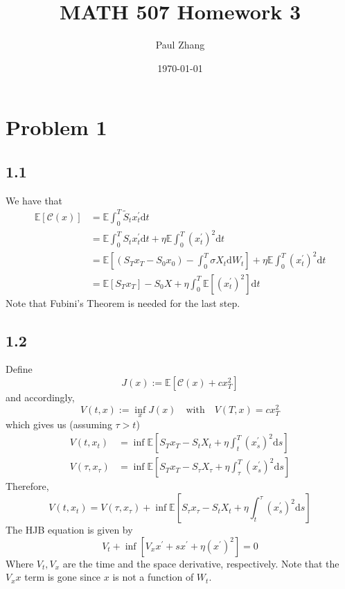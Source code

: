 \documentclass{article}
\title{\Large\bf MATH 507 Homework 3}
\author{\normalsize Paul Zhang}
\date{\normalsize\today}
\begin{document}
\maketitle
\small
\section*{Problem 1}
\subsection*{1.1}
We have that 
\begin{align*}
    \mathbb{E}[\mathcal{C}(x)] &= \mathbb{E}\int_0^T \tilde{S}_t x^\prime_t \mathrm{d}t \\
    &= \mathbb{E}\int_0^T S_t x^\prime_t \mathrm{d}t + \eta \mathbb{E}\int_0^T (x^\prime_t)^2 \mathrm{d}t \\
    &= \mathbb{E}\left[(S_Tx_T - S_0x_0) - \int_0^T \sigma X_t \mathrm{d}W_t\right] + \eta \mathbb{E}\int_0^T 
    (x^\prime_t)^2 \mathrm{d}t \\
    &= \mathbb{E}[S_Tx_T] - S_0X + \eta \int_0^T \mathbb{E}[(x^\prime_t)^2] \mathrm{d}t
\end{align*}
Note that Fubini's Theorem is needed for the last step.

\subsection*{1.2}
Define 
$$ J(x) := \mathbb{E}[\mathcal{C}(x) + c x_T^2] $$
and accordingly,
$$ V(t, x) := \inf_{x}J(x) \quad \text{with}\quad V(T, x) = cx^2_T $$
which gives us (assuming $\tau > t$)
\begin{align*}
    V(t, x_t) &= \inf \mathbb{E}\left[S_Tx_T - S_tX_t + \eta \int_t^T (x_s^\prime)^2 \mathrm{d}s \right] \\
    V(\tau, x_\tau) &= \inf \mathbb{E}\left[S_Tx_T - S_\tau X_\tau + \eta \int_\tau^T (x_s^\prime)^2 \mathrm{d}s \right]
\end{align*}
Therefore,
$$ V(t, x_t) = V(\tau, x_\tau) + \inf \mathbb{E}\left[S_\tau x_\tau - S_tX_t + \eta \int_t^\tau (x_s^\prime)^2 \mathrm{d}s\right]$$
The HJB equation is given by 
$$ V_t + \inf [V_x x^\prime + sx^\prime + \eta (x^\prime)^2] = 0 $$
Where $V_t, V_x$ are the time and the space derivative, respectively. Note that the $V_xx$ term is gone since $x$ is 
not a function of $W_t$.
\end{document}
